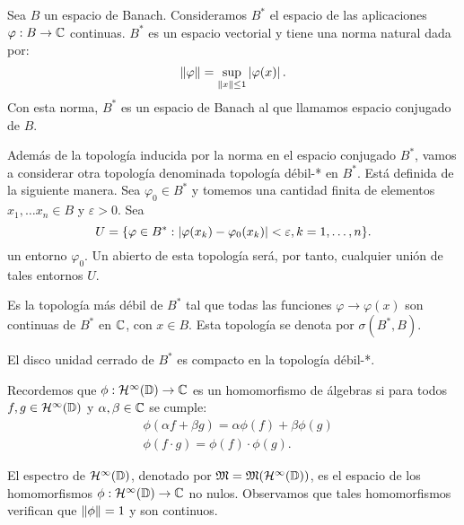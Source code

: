 \begin{definition}
    Sea $B$ un espacio de Banach. Consideramos $B^*$ el espacio de las aplicaciones $\varphi: B \rightarrow \mathbb{C}$ continuas. $B^*$ es un espacio vectorial y tiene una norma natural dada por:
    \begin{equation*}
        \left\lVert\varphi\right\rVert = \sup_{\left\lVert x\right\rVert \leq 1} \left\lvert\varphi(x)\right\rvert.
    \end{equation*}
    Con esta norma, $B^*$ es un espacio de Banach al que llamamos espacio conjugado de $B$.
\end{definition}

\medskip
Además de la topología inducida por la norma en el espacio conjugado $B^*$, vamos a considerar otra topología denominada topología débil-* en $B^*$. Está definida de la siguiente manera. Sea $\varphi_0 \in B^*$ y tomemos una cantidad finita de elementos $x_1, \dots x_n \in B$ y $\varepsilon > 0$. Sea
\begin{equation*}
U = \{ \varphi \in B^*: \left\lvert\varphi(x_k) - \varphi_0 (x_k)\right\rvert < \varepsilon, k = 1, \dots, n\}.
\end{equation*}
un entorno $\varphi_0$. Un abierto de esta topología será, por tanto, cualquier unión de tales entornos $U$.

Es la topología más débil de $B^*$ tal que todas las funciones $\varphi \rightarrow \varphi(x)$ son continuas de $B^*$ en $\mathbb{C}$, con $x \in B$. Esta topología se denota por $\sigma(B^*, B)$. %

\begin{obs}
    El disco unidad cerrado de $B^*$ es compacto en la topología débil-*.
\end{obs}
\bigskip

Recordemos que $\phi : \mathcal{H}^{\infty}(\mathbb{D}) \rightarrow \mathbb{C}$ es un homomorfismo de álgebras si para todos $f, g \in \mathcal{H}^{\infty}(\mathbb{D})$ y $\alpha, \beta \in \mathbb{C}$ se cumple:
\begin{equation}
    \begin{split}
        & \phi (\alpha f + \beta g) = \alpha \phi(f) + \beta \phi(g) \\
        & \phi(f \cdot g) = \phi(f) \cdot \phi(g).
    \end{split}
\end{equation}

El espectro de $\mathcal{H}^{\infty}(\mathbb{D})$, denotado por $\mathfrak{M} = \mathfrak{M} (\mathcal{H}^{\infty}(\mathbb{D}))$, es el espacio de los homomorfismos $\phi: \mathcal{H}^{\infty}(\mathbb{D}) \rightarrow \mathbb{C}$ no nulos. Observamos que tales homomorfismos verifican que $\left\lVert\phi\right\rVert = 1$ y son continuos.\\

